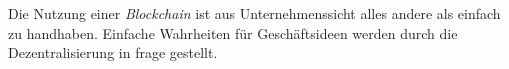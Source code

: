 
Die Nutzung einer \emph{Blockchain} ist aus Unternehmenssicht alles andere als einfach zu handhaben.
Einfache Wahrheiten für Geschäftsideen werden durch die Dezentralisierung in frage gestellt.



